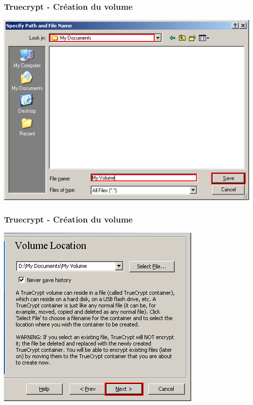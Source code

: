 \documentclass{beamer}
\begin{document}
\begin{frame}
\frametitle{Truecrypt - Création du volume}
\begin{center}
\includegraphics[scale=0.5] {./images/Truecrypt05.png}
\end{center}
\end{frame}
\begin{frame}
\frametitle{Truecrypt - Création du volume}
\begin{center}
\includegraphics[scale=0.5] {./images/Truecrypt06.png} 
\end{center}
\end{frame}
\end{document}
